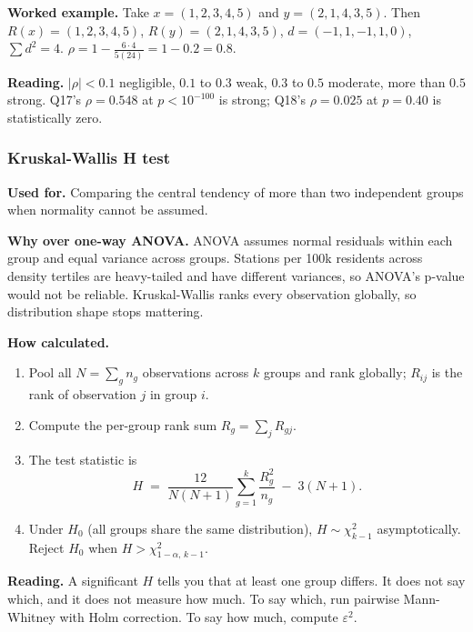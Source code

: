 \textbf{Worked example.} Take $x = (1, 2, 3, 4, 5)$ and
$y = (2, 1, 4, 3, 5)$. Then $R(x) = (1, 2, 3, 4, 5)$, $R(y) = (2, 1, 4, 3, 5)$,
$d = (-1, 1, -1, 1, 0)$, $\sum d^2 = 4$.
$\rho = 1 - \tfrac{6 \cdot 4}{5(24)} = 1 - 0.2 = 0.8$.

\textbf{Reading.} $|\rho| < 0.1$ negligible, $0.1$ to $0.3$ weak,
$0.3$ to $0.5$ moderate, more than $0.5$ strong. Q17's
$\rho = 0.548$ at $p < 10^{-100}$ is strong; Q18's $\rho = 0.025$ at
$p = 0.40$ is statistically zero.

\subsubsection{Kruskal-Wallis H test}

\textbf{Used for.} Comparing the central tendency of more than two
independent groups when normality cannot be assumed.

\textbf{Why over one-way ANOVA.} ANOVA assumes normal residuals
within each group and equal variance across groups. Stations per 100k
residents across density tertiles are heavy-tailed and have different
variances, so ANOVA's p-value would not be reliable. Kruskal-Wallis
ranks every observation globally, so distribution shape stops
mattering.

\textbf{How calculated.}

\begin{enumerate}
  \item Pool all $N = \sum_g n_g$ observations across $k$ groups and
        rank globally; $R_{ij}$ is the rank of observation $j$ in
        group $i$.
  \item Compute the per-group rank sum $R_g = \sum_j R_{gj}$.
  \item The test statistic is
        \begin{equation*}
          H \;=\; \frac{12}{N(N+1)} \sum_{g=1}^{k} \frac{R_g^2}{n_g} \;-\; 3(N+1).
        \end{equation*}
  \item Under $H_0$ (all groups share the same distribution),
        $H \sim \chi^2_{k-1}$ asymptotically. Reject $H_0$ when
        $H > \chi^2_{1-\alpha,\, k-1}$.
\end{enumerate}

\textbf{Reading.} A significant $H$ tells you that at least one group
differs. It does not say which, and it does not measure how much. To
say which, run pairwise Mann-Whitney with Holm correction. To say
how much, compute $\varepsilon^2$.

